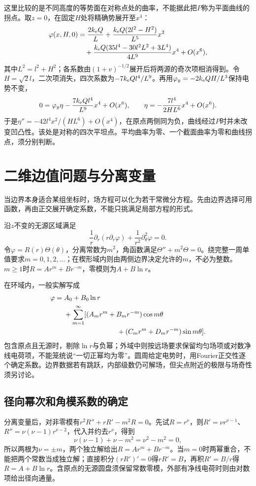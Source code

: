 \begin{solution}
这里比较的是不同高度的等势面在对称点处的曲率，不能据此把$P$称为平面曲线的拐点。取$z=0$，在固定$H$处将精确势展开至$x^4$：
\[\begin{aligned}
\varphi(x,H,0)&=\frac{2k_{\rm e} Q}{L}
+\frac{k_{\rm e} Q(2l^2-H^2)}{L^5}x^2\\
&\quad+\frac{k_{\rm e} Q(35l^4-30l^2L^2+3L^4)}{4L^9}x^4+O(x^6),
\end{aligned}\]
其中$L^2=l^2+H^2$；各系数由$(1+v)^{-1/2}$展开后将两源的奇次项相消得到。令$H=\sqrt2l$，二次项消失，四次系数为$-7k_{\rm e} Ql^4/L^9$。再用$\varphi_y=-2k_{\rm e} QH/L^3$保持电势不变，
\[0=\varphi_y\eta-\frac{7k_{\rm e} Ql^4}{L^9}x^4+O(x^6),
\qquad \eta=-\frac{7l^4}{2HL^6}x^4+O(x^6).\]
于是$\eta''=-42l^4x^2/(HL^6)+O(x^4)$，在原点两侧同为负，曲线经过$P$时并未改变凹凸性。该处是对称的四次平坦点。平均曲率为零、一个截面曲率为零和曲线拐点，须分别判断。
\end{solution}

\section{二维边值问题与分离变量}\label{sec:es2-separation}
当边界本身适合某组坐标时，场方程可以化为若干常微分方程。先由边界选择可用函数，再由正交展开确定系数，不能只挑满足局部方程的形式。

沿$z$不变的无源区域满足
\[\frac1r\partial_r(r\partial_r\varphi)+\frac1{r^2}\partial_\theta^2\varphi=0.
\]
令$\varphi=R(r)\Theta(\theta)$，分离常数为$m^2$，角函数满足$\Theta''+m^2\Theta=0$。绕完整一周单值要求$m=0,1,2,\ldots$；在楔形域内则由两侧边界决定允许的$m$，不必为整数。$m\ge1$时$R=Ar^m+Br^{-m}$，零模则为$A+B\ln r$。

在环域内，一般实解写成
\[\begin{split}\varphi={}&A_0+B_0\ln r\\
&+\sum_{m=1}^\infty[(A_mr^m+B_mr^{-m})\cos m\theta\\
&\hspace{27mm}+(C_mr^m+D_mr^{-m})\sin m\theta].\end{split}\]
包含原点且无源时，剔除$\ln r$与负幂；外域中则按远场要求保留均匀场项或对数净线电荷项，不能笼统说“一切正幂均为零”。圆周给定电势时，用Fourier正交性逐个确定系数。边界数据若有跳跃，内部级数仍可解场，但尖点附近的极限与场奇性须另讨论。


\subsection{径向幂次和角模系数的确定}
分离变量后，对非零模有$r^2R''+rR'-m^2R=0$。先试$R=r^\nu$，则$R'=\nu r^{\nu-1}$、$R''=\nu(\nu-1)r^{\nu-2}$，代入并约去$r^\nu$，得到
\[\nu(\nu-1)+\nu-m^2=\nu^2-m^2=0,
\]
所以两根为$\nu=\pm m$，两个独立解给出$R=Ar^m+Br^{-m}$。当$m=0$时两幂重合，不能把两个常数当成独立解；直接积分$(rR')'=0$得$rR'=B$，再积$R'=B/r$得$R=A+B\ln r$。含原点的无源圆盘须保留常数零模，外部有净线电荷时则由对数项给出径向通量。

